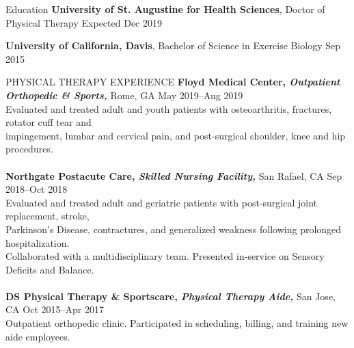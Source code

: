 \documentclass{resume} %
\begin{document}
\vspace{-15pt}
\begin{rSection}{Education}
{\bf University of St. Augustine for Health Sciences}, Doctor of Physical Therapy  \hfill {Expected Dec 2019}

{\bf University of California, Davis}, Bachelor of Science in Exercise Biology  \hfill {Sep 2015}
\end{rSection}
\begin{rSection}{PHYSICAL THERAPY EXPERIENCE}
{\textbf{Floyd Medical Center, \textit{Outpatient Orthopedic \& Sports,}} Rome, GA
\hfill May 2019--Aug 2019 \\
 Evaluated and treated adult and youth patients with osteoarthritis, fractures, rotator cuff tear and \\impingement, lumbar and cervical pain, and post-surgical shoulder, knee and hip procedures.}
 \\\\
{\textbf{Northgate Postacute Care, \textit{Skilled Nursing Facility,}} San Rafael, CA
\hfill Sep 2018--Oct 2018 \\
 Evaluated and treated adult and geriatric patients with post-surgical joint replacement, stroke, \\Parkinson's Disease, contractures, and generalized weakness following prolonged hospitalization. \\Collaborated with a multidisciplinary team. Presented in-service on Sensory Deficits and Balance.}
 \\\\
 {\textbf{DS Physical Therapy \& Sportscare, \textit{Physical Therapy Aide,}} San Jose, CA
\hfill Oct 2015--Apr 2017 \\
 Outpatient orthopedic clinic. Participated in scheduling, billing, and training new aide employees.}
\end{rSection} 
\end{document}
